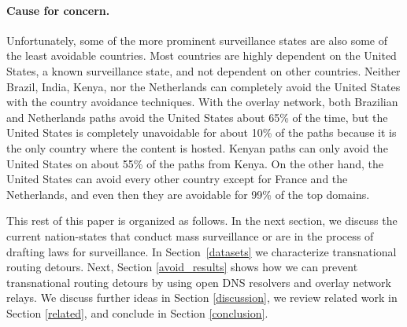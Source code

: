 \paragraph{Cause for concern.} Unfortunately, some of the more prominent surveillance states are also
some of the least avoidable countries.  Most countries are
highly dependent on the United States, a known surveillance state, and
not dependent on other countries.  Neither Brazil, India, Kenya, nor the
Netherlands can completely avoid the United States with the country
avoidance techniques.  With the overlay network, both Brazilian and
Netherlands paths avoid the United States about 65\% of the time, but
the United States is completely unavoidable for about 10\% of the paths
because it is the only country where the content is hosted.  Kenyan paths can
only avoid the United States on about 55\% of the paths from Kenya.  On the other hand, the United States can avoid
every other country except for France and the Netherlands, and even then
they are avoidable for 99\% of the top domains. 



This rest of this paper is organized as follows.  In the next section, we discuss
the current nation-states that conduct mass surveillance or are in the 
process of drafting laws for surveillance.  In
Section~\ref{datasets} we characterize transnational routing detours. Next, Section
\ref{avoid_results} shows how we can prevent transnational routing detours by using open DNS resolvers
and overlay network relays.  We discuss further ideas in Section
\ref{discussion}, we review related work in Section \ref{related}, and
conclude in Section \ref{conclusion}. 
